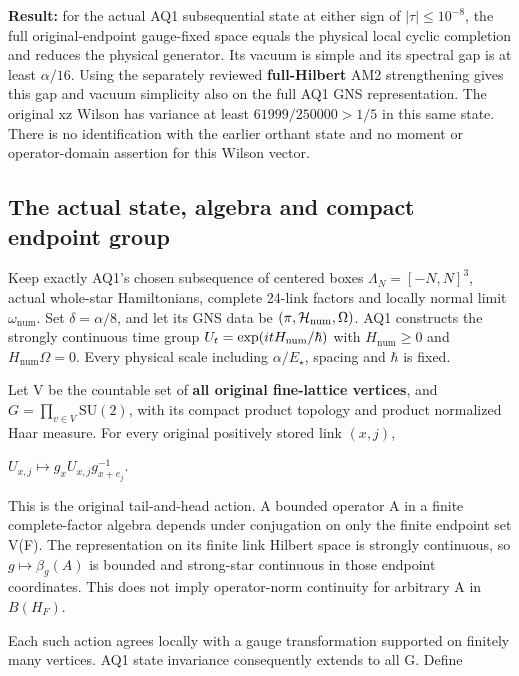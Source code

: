 \textbf{Result:} for the actual AQ1 subsequential state at either sign of \(|\tau|\le 10^{-8}\), the full original-endpoint gauge-fixed space equals the physical local cyclic completion and reduces the physical generator. Its vacuum is simple and its spectral gap is at least \(\alpha/16\). Using the separately reviewed \textbf{full-Hilbert} AM2 strengthening gives this gap and vacuum simplicity also on the full AQ1 GNS representation. The original xz Wilson has variance at least \(61999/250000>1/5\) in this same state. There is no identification with the earlier orthant state and no moment or operator-domain assertion for this Wilson vector.

\hypertarget{r29-aq2-the-actual-state-algebra-and-compact-endpoint-group}{%
\subsection{The actual state, algebra and compact endpoint group}\label{r29:aq2:r29-aq2-the-actual-state-algebra-and-compact-endpoint-group}}

Keep exactly AQ1's chosen subsequence of centered boxes \(\Lambda_N=[-N,N]^{3}\), actual whole-star Hamiltonians, complete 24-link factors and locally normal limit \(\omega_{\mathrm{num}}\). Set \(\delta=\alpha/8\), and let its GNS data be \((\pi,\mathcal H_{\rm num},\Omega)\). AQ1 constructs the strongly continuous time group \(U_t=\exp(itH_{\rm num}/\hbar)\) with \(H_{\mathrm{num}}\ge 0\) and \(H_{\mathrm{num}} \Omega=0\). Every physical scale including \(\alpha/E_\star\), spacing and \(\hbar\) is fixed.

Let V be the countable set of \textbf{all original fine-lattice vertices}, and \(G=\prod_{v\in V}\mathrm{SU}(2)\), with its compact product topology and product normalized Haar measure. For every original positively stored link \((x,j)\),

\(U_{x,j}\longmapsto g_xU_{x,j}g_{x+e_j}^{-1}\).

This is the original tail-and-head action. A bounded operator A in a finite complete-factor algebra depends under conjugation on only the finite endpoint set V(F). The representation on its finite link Hilbert space is strongly continuous, so \(g\longmapsto\beta_g(A)\) is bounded and strong-star continuous in those endpoint coordinates. This does not imply operator-norm continuity for arbitrary A in \(B(H_F)\).

Each such action agrees locally with a gauge transformation supported on finitely many vertices. AQ1 state invariance consequently extends to all G. Define


